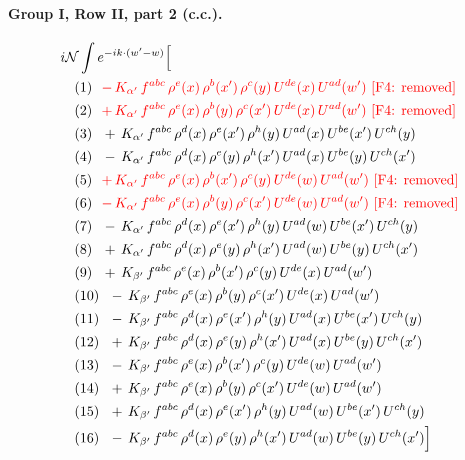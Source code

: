 \documentclass[10pt]{article}
\numberwithin{equation}{section}
\newcommand{\NN}{\mathcal N}
\begin{document}
\paragraph{Group I, Row II, part 2 (c.c.).}
\begin{align*}
&i\NN\int e^{-ik\cdot(w'-w)}\Big[\\
&\quad\text{(1)}\ \ \textcolor{red}{-\,K_{\alpha'}\,f^{abc}\,\rho^{e}(x)\,\rho^{b}(x')\,\rho^{c}(y)\,U^{de}(x)\,U^{ad}(w')}\ \text{\textcolor{red}{[F4: removed]}}\\
&\quad\text{(2)}\ \ \textcolor{red}{+\,K_{\alpha'}\,f^{abc}\,\rho^{e}(x)\,\rho^{b}(y)\,\rho^{c}(x')\,U^{de}(x)\,U^{ad}(w')}\ \text{\textcolor{red}{[F4: removed]}}\\
&\quad\text{(3)}\ \ +\,K_{\alpha'}\,f^{abc}\,\rho^{d}(x)\,\rho^{e}(x')\,\rho^{h}(y)\,U^{ad}(x)\,U^{be}(x')\,U^{ch}(y)\\
&\quad\text{(4)}\ \ -\,K_{\alpha'}\,f^{abc}\,\rho^{d}(x)\,\rho^{e}(y)\,\rho^{h}(x')\,U^{ad}(x)\,U^{be}(y)\,U^{ch}(x')\\
&\quad\text{(5)}\ \ \textcolor{red}{+\,K_{\alpha'}\,f^{abc}\,\rho^{e}(x)\,\rho^{b}(x')\,\rho^{c}(y)\,U^{de}(w)\,U^{ad}(w')}\ \text{\textcolor{red}{[F4: removed]}}\\
&\quad\text{(6)}\ \ \textcolor{red}{-\,K_{\alpha'}\,f^{abc}\,\rho^{e}(x)\,\rho^{b}(y)\,\rho^{c}(x')\,U^{de}(w)\,U^{ad}(w')}\ \text{\textcolor{red}{[F4: removed]}}\\
&\quad\text{(7)}\ \ -\,K_{\alpha'}\,f^{abc}\,\rho^{d}(x)\,\rho^{e}(x')\,\rho^{h}(y)\,U^{ad}(w)\,U^{be}(x')\,U^{ch}(y)\\
&\quad\text{(8)}\ \ +\,K_{\alpha'}\,f^{abc}\,\rho^{d}(x)\,\rho^{e}(y)\,\rho^{h}(x')\,U^{ad}(w)\,U^{be}(y)\,U^{ch}(x')\\
&\quad\text{(9)}\ \ +\,K_{\beta'}\,f^{abc}\,\rho^{e}(x)\,\rho^{b}(x')\,\rho^{c}(y)\,U^{de}(x)\,U^{ad}(w')\\
&\quad\text{(10)}\ \ -\,K_{\beta'}\,f^{abc}\,\rho^{e}(x)\,\rho^{b}(y)\,\rho^{c}(x')\,U^{de}(x)\,U^{ad}(w')\\
&\quad\text{(11)}\ \ -\,K_{\beta'}\,f^{abc}\,\rho^{d}(x)\,\rho^{e}(x')\,\rho^{h}(y)\,U^{ad}(x)\,U^{be}(x')\,U^{ch}(y)\\
&\quad\text{(12)}\ \ +\,K_{\beta'}\,f^{abc}\,\rho^{d}(x)\,\rho^{e}(y)\,\rho^{h}(x')\,U^{ad}(x)\,U^{be}(y)\,U^{ch}(x')\\
&\quad\text{(13)}\ \ -\,K_{\beta'}\,f^{abc}\,\rho^{e}(x)\,\rho^{b}(x')\,\rho^{c}(y)\,U^{de}(w)\,U^{ad}(w')\\
&\quad\text{(14)}\ \ +\,K_{\beta'}\,f^{abc}\,\rho^{e}(x)\,\rho^{b}(y)\,\rho^{c}(x')\,U^{de}(w)\,U^{ad}(w')\\
&\quad\text{(15)}\ \ +\,K_{\beta'}\,f^{abc}\,\rho^{d}(x)\,\rho^{e}(x')\,\rho^{h}(y)\,U^{ad}(w)\,U^{be}(x')\,U^{ch}(y)\\
&\quad\text{(16)}\ \ -\,K_{\beta'}\,f^{abc}\,\rho^{d}(x)\,\rho^{e}(y)\,\rho^{h}(x')\,U^{ad}(w)\,U^{be}(y)\,U^{ch}(x')\Big]
\end{align*}
\end{document}
